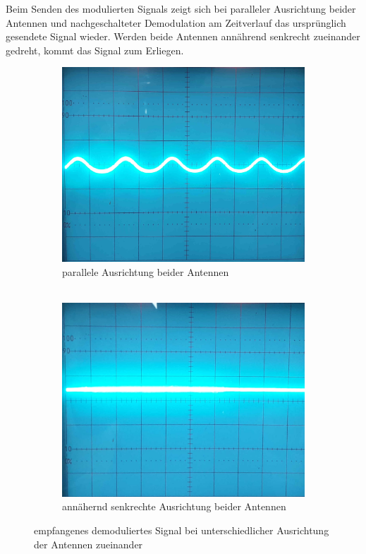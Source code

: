 \documentclass[a4paper,twoside,final]{article}
\begin{document}
Beim Senden des modulierten Signals zeigt sich bei paralleler Ausrichtung beider Antennen und nachgeschalteter Demodulation am Zeitverlauf das ursprünglich gesendete Signal wieder. Werden beide Antennen annährend senkrecht zueinander gedreht, kommt das Signal zum Erliegen.

\begin{figure}[htp]
    \centering
    \begin{subfigure}{0.45\textwidth}
        \includegraphics[width=\textwidth]{Bilder/Antenne_Demodulation_parallel.jpg}
        \caption{parallele Ausrichtung beider Antennen\\$~$}
    \end{subfigure}\hspace{1cm}
    \begin{subfigure}{0.45\textwidth}
        \includegraphics[width=\textwidth]{Bilder/Antenne_Demodulation_senkrecht.jpg}
        \caption{annähernd senkrechte Ausrichtung beider Antennen}
    \end{subfigure}
    \caption{empfangenes demoduliertes Signal bei unterschiedlicher Ausrichtung der Antennen zueinander}
\end{figure}
\end{document}
